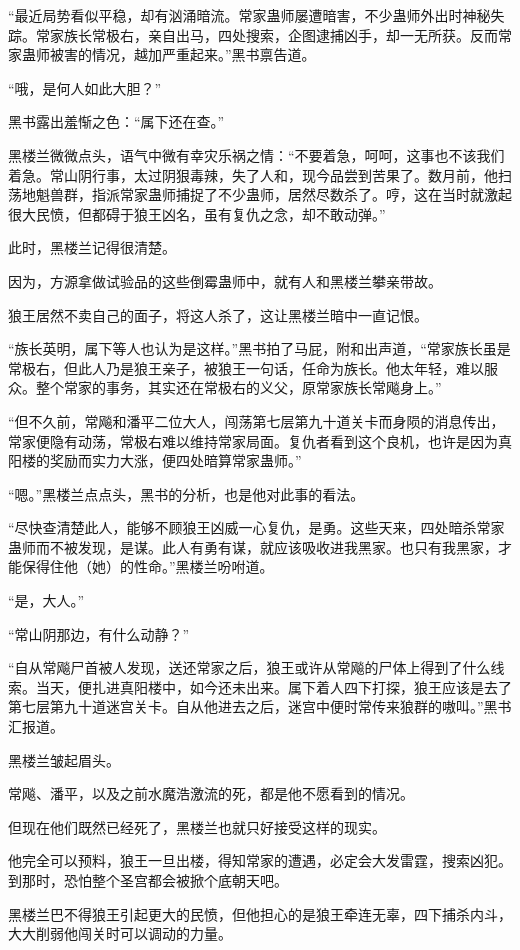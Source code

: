 \begin{this_body}
“最近局势看似平稳，却有汹涌暗流。常家蛊师屡遭暗害，不少蛊师外出时神秘失踪。常家族长常极右，亲自出马，四处搜索，企图逮捕凶手，却一无所获。反而常家蛊师被害的情况，越加严重起来。”黑书禀告道。

“哦，是何人如此大胆？”

黑书露出羞惭之色：“属下还在查。”

黑楼兰微微点头，语气中微有幸灾乐祸之情：“不要着急，呵呵，这事也不该我们着急。常山阴行事，太过阴狠毒辣，失了人和，现今品尝到苦果了。数月前，他扫荡地魁兽群，指派常家蛊师捕捉了不少蛊师，居然尽数杀了。哼，这在当时就激起很大民愤，但都碍于狼王凶名，虽有复仇之念，却不敢动弹。”

此时，黑楼兰记得很清楚。

因为，方源拿做试验品的这些倒霉蛊师中，就有人和黑楼兰攀亲带故。

狼王居然不卖自己的面子，将这人杀了，这让黑楼兰暗中一直记恨。

“族长英明，属下等人也认为是这样。”黑书拍了马屁，附和出声道，“常家族长虽是常极右，但此人乃是狼王亲子，被狼王一句话，任命为族长。他太年轻，难以服众。整个常家的事务，其实还在常极右的义父，原常家族长常飚身上。”

“但不久前，常飚和潘平二位大人，闯荡第七层第九十道关卡而身陨的消息传出，常家便隐有动荡，常极右难以维持常家局面。复仇者看到这个良机，也许是因为真阳楼的奖励而实力大涨，便四处暗算常家蛊师。”

“嗯。”黑楼兰点点头，黑书的分析，也是他对此事的看法。

“尽快查清楚此人，能够不顾狼王凶威一心复仇，是勇。这些天来，四处暗杀常家蛊师而不被发现，是谋。此人有勇有谋，就应该吸收进我黑家。也只有我黑家，才能保得住他（她）的性命。”黑楼兰吩咐道。

“是，大人。”

“常山阴那边，有什么动静？”

“自从常飚尸首被人发现，送还常家之后，狼王或许从常飚的尸体上得到了什么线索。当天，便扎进真阳楼中，如今还未出来。属下着人四下打探，狼王应该是去了第七层第九十道迷宫关卡。自从他进去之后，迷宫中便时常传来狼群的嗷叫。”黑书汇报道。

黑楼兰皱起眉头。

常飚、潘平，以及之前水魔浩激流的死，都是他不愿看到的情况。

但现在他们既然已经死了，黑楼兰也就只好接受这样的现实。

他完全可以预料，狼王一旦出楼，得知常家的遭遇，必定会大发雷霆，搜索凶犯。到那时，恐怕整个圣宫都会被掀个底朝天吧。

黑楼兰巴不得狼王引起更大的民愤，但他担心的是狼王牵连无辜，四下捕杀内斗，大大削弱他闯关时可以调动的力量。


\end{this_body}
